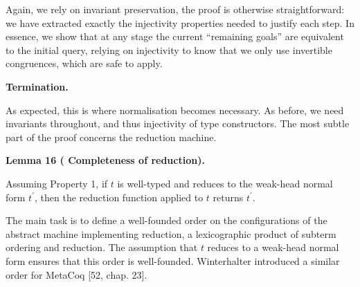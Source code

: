 \documentclass[10pt,a4paper]{amsart}
\begin{document}
 
 
 
Again, we rely on invariant preservation, the proof is otherwise straightforward: we have extracted exactly the injectivity properties needed to justify each step. In essence, we show that at any stage the current “remaining goals” are equivalent to the initial query, relying on injectivity to know that we only use invertible congruences, which are safe to apply.\par
 
 
 
 
\par\medskip\noindent\textbf{Termination.}\par
 
 
As expected, this is where normalisation becomes necessary. As before, we need invariants throughout, and thus injectivity of type constructors. The most subtle part of the proof concerns the reduction machine.\par
 
 
 
\par\medskip\noindent\textbf{Lemma 16 (  Completeness of reduction).}\par
 
 
Assuming Property 1, if $t$ is well-typed and reduces to the weak-head normal form $t^{\prime}$, then the reduction function applied to $t$ returns $t^{\prime}$.\par
 
 
 
 
The main task is to define a well-founded order on the configurations of the abstract machine implementing reduction, a lexicographic product of subterm ordering and reduction. The assumption that $t$ reduces to a weak-head normal form ensures that this order is well-founded. Winterhalter introduced a similar order for MetaCoq [52, chap. 23].\par
 
\end{document}
